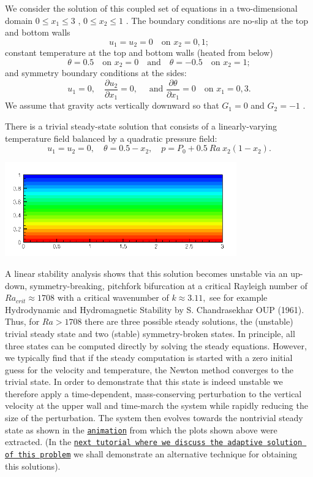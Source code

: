We consider the solution of this coupled set of equations in a two-\/dimensional domain $ 0 \leq x_{1} \leq 3 $ , $ 0 \leq x_{2} \leq 1 $ . The boundary conditions are no-\/slip at the top and bottom walls \[ u_{1} = u_{2} = 0 \quad\mbox{on } x_{2} = 0, 1; \] constant temperature at the top and bottom walls (heated from below) \[ \theta = 0.5 \quad\mbox{on } x_{2}=0 \quad\mbox{and}\quad \theta = -0.5 \quad\mbox{on } x_{2} = 1; \] and symmetry boundary conditions at the sides\+: \[ u_{1} = 0,\quad \frac{\partial u_{2}}{\partial x_{1}} = 0, \quad \mbox{ and } \frac{\partial \theta}{\partial x_{1}} = 0 \quad\mbox{on } x_{1} = 0,3. \] We assume that gravity acts vertically downward so that $ G_{1} = 0 $ and $ G_{2} = -1 $ .

There is a trivial steady-\/state solution that consists of a linearly-\/varying temperature field balanced by a quadratic pressure field\+: \[ u_{1} = u_{2} = 0, \quad \theta = 0.5 - x_2, \quad p = P_{0} + 0.5 \ Ra \ x_{2} \left(1 - x_{2}\right). \]

 
\begin{DoxyImage}
\includegraphics[width=0.75\textwidth]{base_flow}
\end{DoxyImage}


A linear stability analysis shows that this solution becomes unstable via an up-\/down, symmetry-\/breaking, pitchfork bifurcation at a critical Rayleigh number of $ Ra_{crit} \approx 1708 $ with a critical wavenumber of $ k \approx 3.11, $ see for example Hydrodynamic and Hydromagnetic Stability by S. Chandrasekhar O\+UP (1961). Thus, for $ Ra > 1708 $ there are three possible steady solutions, the (unstable) trivial steady state and two (stable) symmetry-\/broken states. In principle, all three states can be computed directly by solving the steady equations. However, we typically find that if the steady computation is started with a zero initial guess for the velocity and temperature, the Newton method converges to the trivial state. In order to demonstrate that this state is indeed unstable we therefore apply a time-\/dependent, mass-\/conserving perturbation to the vertical velocity at the upper wall and time-\/march the system while rapidly reducing the size of the perturbation. The system then evolves towards the nontrivial steady state as shown in the \href{../figures/convect.avi}{\tt animation} from which the plots shown above were extracted. (In the \href{../../refine_b_convect/html/index.html}{\tt next tutorial where we discuss the adaptive solution of this problem} we shall demonstrate an alternative technique for obtaining this solutions).


